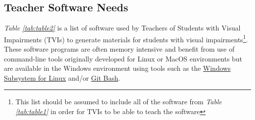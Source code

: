 \pagebreak \hypertarget{teacher-software-needs}{}\subsection{Teacher Software Needs}\label{teacher-software-needs}
\textit{Table \ref{tab:table2}} is a list of software used by Teachers of Students with Visual Impairments (TVIs) to generate materials for students with visual impairments\footnote{\raggedright This list should be assumed to include all of the software from \textit{Table \ref{tab:table1}} in order for TVIs to be able to teach the software}.
These software programs are often memory intensive and benefit from use of command-line tools originally developed for Linux or MacOS environments but are available in the Windows environment using tools such as the \href{http://learn.Microsoft.com/en-us/windows/wsl/about}{Windows Subsystem for Linux} and/or \href{http://git-scm.com/download/win}{Git Bash}.

